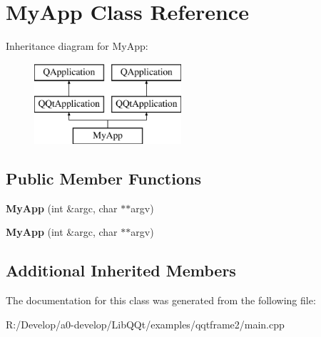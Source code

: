\hypertarget{class_my_app}{}\section{My\+App Class Reference}
\label{class_my_app}
Inheritance diagram for My\+App\+:\begin{figure}[H]
\begin{center}
\leavevmode
\includegraphics[height=3.000000cm]{class_my_app}
\end{center}
\end{figure}
\subsection*{Public Member Functions}
\begin{DoxyCompactItemize}
\item 
\mbox{\label{class_my_app_a5a7281c407006c4f976906b5682c7a78}} 
{\bfseries My\+App} (int \&argc, char $\ast$$\ast$argv)
\item 
\mbox{\label{class_my_app_a5a7281c407006c4f976906b5682c7a78}} 
{\bfseries My\+App} (int \&argc, char $\ast$$\ast$argv)
\end{DoxyCompactItemize}
\subsection*{Additional Inherited Members}


The documentation for this class was generated from the following file\+:\begin{DoxyCompactItemize}
\item 
R\+:/\+Develop/a0-\/develop/\+Lib\+Q\+Qt/examples/qqtframe2/main.\+cpp\end{DoxyCompactItemize}
